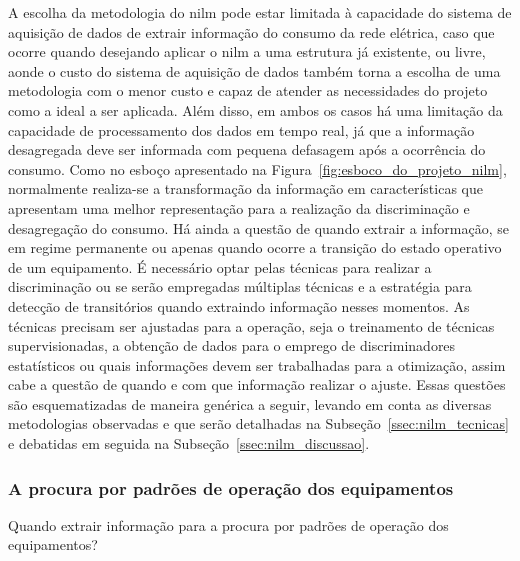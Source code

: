 A escolha da metodologia do \acs{nilm} pode estar limitada à
capacidade do sistema de aquisição de dados de extrair informação do
consumo da rede elétrica, caso que ocorre quando desejando aplicar o
\acs{nilm} a uma estrutura já existente, ou livre, aonde o custo do
sistema de aquisição de dados também torna a escolha de uma
metodologia com o menor custo e capaz de atender as necessidades do
projeto como a ideal a ser aplicada. Além disso, em ambos os casos há
uma limitação da capacidade de processamento dos dados em tempo real,
já que a informação desagregada deve ser informada com pequena
defasagem após a ocorrência do consumo. Como no esboço apresentado na
Figura~\ref{fig:esboco_do_projeto_nilm}, normalmente realiza-se a
transformação da informação em características que apresentam uma
melhor representação para a realização da discriminação e desagregação
do consumo. Há ainda a questão de quando extrair a informação, se em
regime permanente ou apenas quando ocorre a transição do estado
operativo de um equipamento. É necessário optar pelas técnicas para
realizar a discriminação ou se serão empregadas múltiplas técnicas e a
estratégia para detecção de transitórios quando extraindo informação
nesses momentos. As técnicas precisam ser ajustadas para a operação,
seja o treinamento de técnicas supervisionadas, a obtenção de dados
para o emprego de discriminadores estatísticos ou quais informações
devem ser trabalhadas para a otimização, assim cabe a questão de
quando e com que informação realizar o ajuste. Essas questões são
esquematizadas de maneira genérica a seguir, levando em conta as
diversas metodologias observadas e que serão detalhadas
na Subseção~\ref{ssec:nilm_tecnicas} e debatidas em seguida na
Subseção~\ref{ssec:nilm_discussao}.

\subsubsection{A procura por padrões de operação dos
equipamentos}
\label{top:procura_padroes}

Quando extrair informação para a procura por padrões de operação dos
equipamentos?

